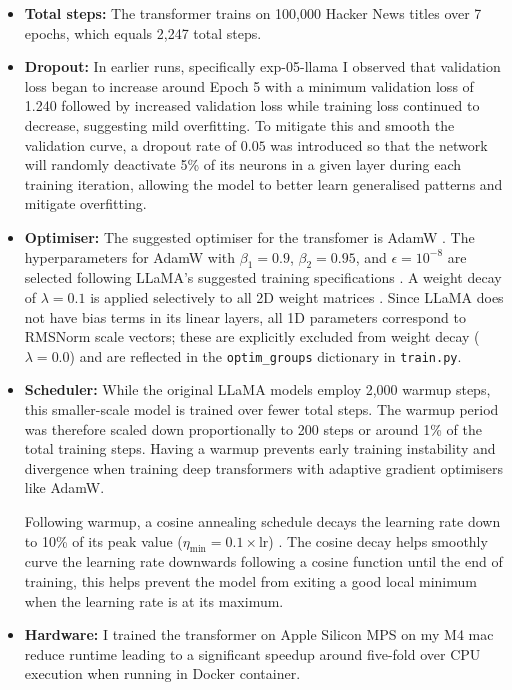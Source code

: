 \documentclass[11pt,a4paper]{article}
\begin{document}
\begin{itemize}
    \item \textbf{Total steps:} The transformer trains on 100,000 Hacker News titles over 7 epochs, which equals  2,247 total steps.
    \item \textbf{Dropout:}  In earlier runs, specifically exp-05-llama I observed that validation loss began to increase around Epoch 5  with a minimum validation loss of 1.240 followed by increased validation loss while training loss continued to decrease, suggesting mild overfitting. To mitigate this and smooth the validation curve, a dropout rate of $0.05$ was introduced so that the network will randomly deactivate 5\% of its neurons  in a given layer during each training iteration, allowing the model to better learn generalised patterns and mitigate overfitting.
        
\item \textbf{Optimiser:} The suggested optimiser for the transfomer is AdamW \cite{attention-is-all-you-need}.  The hyperparameters for AdamW  with $\beta_1 = 0.9$, $\beta_2 = 0.95$, and $\epsilon = 10^{-8}$ are selected following LLaMA's suggested training specifications \cite{llama}. A weight decay of $\lambda = 0.1$ is applied selectively to all 2D weight matrices \cite{llama}. Since LLaMA does not have bias terms in its linear layers, all 1D parameters correspond to RMSNorm scale vectors; these are explicitly excluded from weight decay ($\lambda = 0.0$) and are reflected in the \texttt{optim\_groups} dictionary in \texttt{train.py}.
    
    \item \textbf{Scheduler:} While the original LLaMA models employ 2,000 warmup steps, this smaller-scale model is trained over fewer total steps. The warmup period was therefore scaled down proportionally to 200 steps or around 1\% of the total training steps. Having a warmup prevents early training instability and divergence when training deep transformers with adaptive gradient optimisers like AdamW. 
    
    Following warmup, a cosine annealing schedule decays the learning rate down to 10\% of its peak value ($\eta_{\text{min}} = 0.1 \times \text{lr}$) \cite{llama}.
The cosine decay helps smoothly curve the learning rate downwards following a cosine function until the end of training, this helps prevent the model from exiting a good local minimum when the learning rate is at its maximum.
          


    
    \item \textbf{Hardware:} I trained the transformer on Apple Silicon MPS on my M4 mac reduce runtime leading to a significant speedup around five-fold over CPU execution when running in Docker container.

\end{itemize}
\end{document}
